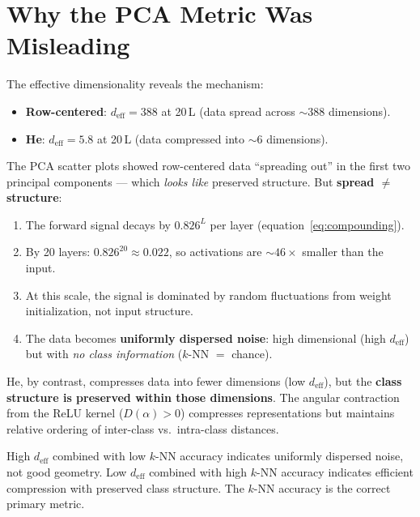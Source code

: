 \section{Why the PCA Metric Was Misleading}
\label{sec:pca_misleading}

The effective dimensionality reveals the mechanism:
\begin{itemize}
  \item \textbf{Row-centered}: $d_{\mathrm{eff}} = 388$ at 20\,L
        (data spread across $\sim$388 dimensions).
  \item \textbf{He}: $d_{\mathrm{eff}} = 5.8$ at 20\,L
        (data compressed into $\sim$6 dimensions).
\end{itemize}

The PCA scatter plots showed row-centered data ``spreading out'' in the
first two principal components --- which \emph{looks like} preserved
structure.  But \textbf{spread $\neq$ structure}:

\begin{enumerate}
  \item The forward signal decays by $0.826^L$ per layer
        (equation~\eqref{eq:compounding}).
  \item By 20 layers: $0.826^{20} \approx 0.022$, so activations are
        $\sim\!46\times$ smaller than the input.
  \item At this scale, the signal is dominated by random fluctuations
        from weight initialization, not input structure.
  \item The data becomes \textbf{uniformly dispersed noise}: high
        dimensional (high $d_{\mathrm{eff}}$) but with
        \emph{no class information} ($k$-NN $=$ chance).
\end{enumerate}

He, by contrast, compresses data into fewer dimensions (low
$d_{\mathrm{eff}}$), but the \textbf{class structure is preserved
within those dimensions}.  The angular contraction from the ReLU kernel
($D(\alpha) > 0$) compresses representations but maintains relative
ordering of inter-class vs.\ intra-class distances.

\begin{remark}
High $d_{\mathrm{eff}}$ combined with low $k$-NN accuracy indicates
uniformly dispersed noise, not good geometry.
Low $d_{\mathrm{eff}}$ combined with high $k$-NN accuracy indicates
efficient compression with preserved class structure.
The $k$-NN accuracy is the correct primary metric.
\end{remark}


